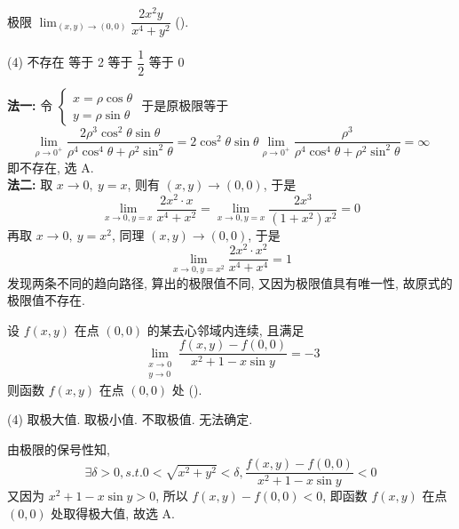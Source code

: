 \begin{example}
    极限 $\displaystyle\lim_{(x,y)\to(0,0)}\dfrac{2x^2y}{x^4+y^2}$ (\quad).
    \begin{tasks}(4)
        \task 不存在
        \task 等于 2
        \task 等于 $\dfrac{1}{2}$
        \task 等于 0
    \end{tasks}
\end{example}
\begin{solution}
    \textbf{法一: }令 $\begin{cases}
            x=\rho\cos\theta \\y=\rho\sin\theta
        \end{cases}$
    于是原极限等于 $$\displaystyle\lim_{\rho\to0^+}\dfrac{2\rho^3\cos^2\theta\sin\theta }{\rho^4\cos^4\theta+\rho^2\sin^2\theta}=2\cos^2\theta\sin\theta\lim_{\rho\to0^+}\dfrac{\rho^3}{\rho^4\cos^4\theta+\rho^2\sin^2\theta}=\infty$$ 即不存在, 选 A.\\
    \textbf{法二: }取 $x\to0,~y=x$, 则有 $(x,y)\to(0,0)$, 于是 $$\displaystyle\lim_{x\to0,y=x}\dfrac{2x^2\cdot x}{x^4+x^2}=\lim_{x\to0,y=x}\dfrac{2x^3}{(1+x^2)x^2}=0$$
    再取 $x\to0,~y=x^2$, 同理 $(x,y)\to(0,0)$, 于是 $$\displaystyle\lim_{x\to0,y=x^2}\dfrac{2x^2\cdot x^2}{x^4+x^4}=1$$
    发现两条不同的趋向路径, 算出的极限值不同, 又因为极限值具有唯一性, 故原式的极限值不存在.
\end{solution}

\begin{example}
    设 $f(x,y)$ 在点 $(0,0)$ 的某去心邻域内连续, 且满足 $$
    \lim_{\substack{x\to0 \\ y\to0}}\dfrac{f(x,y)-f(0,0)}{x^2+1-x\sin y}=-3
    $$
    则函数 $f(x,y)$ 在点 $(0,0)$ 处 (\quad).
    \begin{tasks}(4)
        \task 取极大值.
        \task 取极小值.
        \task 不取极值.
        \task 无法确定.
    \end{tasks}
\end{example}
\begin{solution}
    由极限的保号性知, $$\exists\delta>0,s.t.0<\sqrt{x^2+y^2}<\delta,\dfrac{f(x,y)-f(0,0)}{x^2+1-x\sin y}<0$$
    又因为 $x^2+1-x\sin y>0$, 所以 $f(x,y)-f(0,0)<0$, 即函数 $f(x,y)$ 在点 $(0,0)$  处取得极大值, 故选 A.
\end{solution}

%     

